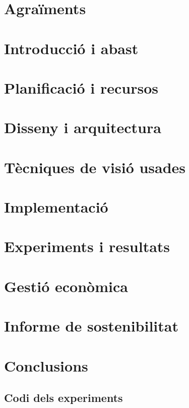 \documentclass[a4paper,12pt]{report}
\begin{document}
	\chapter*{Agraïments}
	

	\tableofcontents
	\chapter{Introducció i abast}
	
	\chapter{Planificació i recursos}
	
	\chapter{Disseny i arquitectura}
	
	\chapter{Tècniques de visió usades}
	
	\chapter{Implementació}
	
	\chapter{Experiments i resultats}
	
	\chapter{Gestió econòmica}
	
	\chapter{Informe de sostenibilitat}
	
	\chapter{Conclusions}
	

	\begin{appendices}
		\chapter{Codi dels experiments}
		\label{appendix:proves}
		
	\end{appendices}

	\printbibliography[heading=bibintoc]
	\cleardoublepage{}
	\listoftables
	\cleardoublepage{}
	\listoffigures
\end{document}
